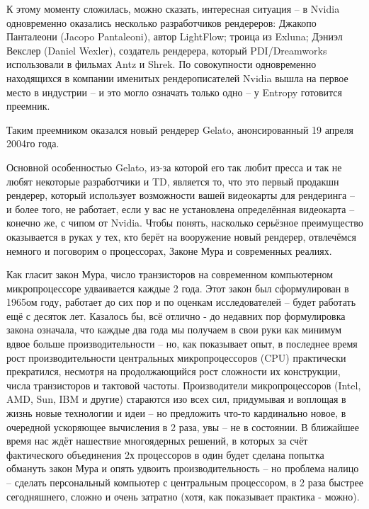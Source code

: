  К этому моменту сложилась, можно сказать,
    интересная ситуация – в Nvidia одновременно оказались несколько
    разработчиков рендереров: Джакопо Панталеони (Jacopo Pantaleoni),
    автор LightFlow; троица из Exluna; Дэниэл Векслер (Daniel Wexler),
    создатель рендерера, который PDI/Dreamworks использовали в фильмах
    Antz и Shrek. По совокупности одновременно находящихся в компании
    именитых рендерописателей Nvidia вышла на первое место в
    индустрии  – и это
    могло означать только одно – у Entropy готовится
    преемник.
  

 Таким преемником оказался новый рендерер Gelato,
    анонсированный 19 апреля 2004го года.
  

 Основной особенностью Gelato, из-за которой его так
    любит пресса и так не любят некоторые разработчики и TD, является
    то, что это первый продакшн рендерер, который использует
    возможности вашей видеокарты для рендеринга – и более того, не
    работает, если у вас не установлена определённая видеокарта –
    конечно же, с чипом от Nvidia. Чтобы понять, насколько серьёзное
    преимущество оказывается в руках у тех, кто берёт на вооружение
    новый рендерер, отвлечёмся немного и поговорим о процессорах,
    Законе Мура и современных реалиях.
  

 Как гласит закон Мура, число транзисторов на
    современном компьютерном микропроцессоре удваивается каждые 2 года.
    Этот закон был сформулирован в 1965ом году, работает до сих пор и
    по оценкам исследователей – будет работать ещё с десяток лет.
    Казалось бы, всё отлично - до недавних пор формулировка закона
    означала, что каждые два года мы получаем в свои руки как минимум
    вдвое больше производительности – но, как показывает опыт, в
    последнее время рост производительности центральных
    микропроцессоров (CPU) практически прекратился, несмотря на
    продолжающийся рост сложности их конструкции, числа транзисторов и
    тактовой частоты. Производители микропроцессоров (Intel, AMD, Sun,
    IBM и другие) стараются изо всех сил, придумывая и воплощая в жизнь
    новые технологии и идеи – но предложить что-то кардинально новое, в
    очередной ускоряющее вычисления в 2 раза, увы – не в состоянии. В
    ближайшее время нас ждёт нашествие многоядерных решений, в которых
    за счёт фактического объединения 2х процессоров в один будет
    сделана попытка обмануть закон Мура и опять удвоить
    производительность – но проблема налицо – сделать персональный
    компьютер с центральным процессором, в 2 раза быстрее сегодняшнего,
    сложно и очень затратно (хотя, как показывает практика -
    можно).
  

